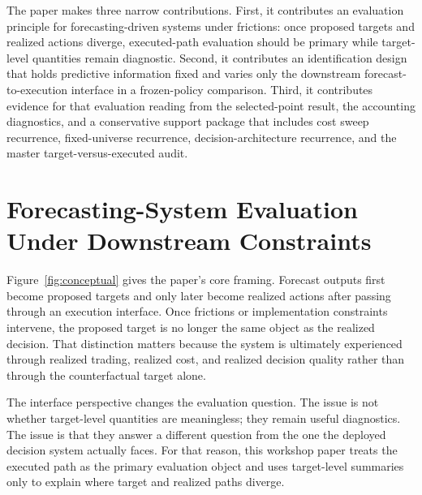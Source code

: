 \documentclass[10pt,twocolumn]{article}
\begin{document}
The paper makes three narrow contributions. First, it contributes an evaluation principle for forecasting-driven systems under frictions: once proposed targets and realized actions diverge, executed-path evaluation should be primary while target-level quantities remain diagnostic. Second, it contributes an identification design that holds predictive information fixed and varies only the downstream forecast-to-execution interface in a frozen-policy comparison. Third, it contributes evidence for that evaluation reading from the selected-point result, the accounting diagnostics, and a conservative support package that includes cost sweep recurrence, fixed-universe recurrence, decision-architecture recurrence, and the master target-versus-executed audit.

\section{Forecasting-System Evaluation Under Downstream Constraints}

Figure~\ref{fig:conceptual} gives the paper's core framing. Forecast outputs first become proposed targets and only later become realized actions after passing through an execution interface. Once frictions or implementation constraints intervene, the proposed target is no longer the same object as the realized decision. That distinction matters because the system is ultimately experienced through realized trading, realized cost, and realized decision quality rather than through the counterfactual target alone.

The interface perspective changes the evaluation question. The issue is not whether target-level quantities are meaningless; they remain useful diagnostics. The issue is that they answer a different question from the one the deployed decision system actually faces. For that reason, this workshop paper treats the executed path as the primary evaluation object and uses target-level summaries only to explain where target and realized paths diverge.
\end{document}
